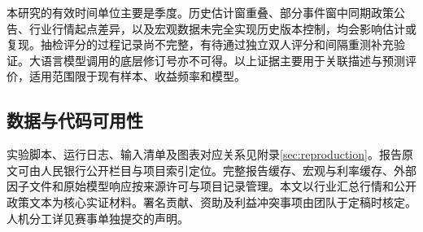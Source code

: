 本研究的有效时间单位主要是季度。历史估计窗重叠、部分事件窗中同期政策公告、行业行情起点差异，以及宏观数据未完全实现历史版本控制，均会影响估计或复现。抽检评分的过程记录尚不完整，有待通过独立双人评分和间隔重测补充验证。大语言模型调用的底层修订号亦不可得。以上证据主要用于关联描述与预测评价，适用范围限于现有样本、收益频率和模型。

\subsection{数据与代码可用性}
实验脚本、运行日志、输入清单及图表对应关系见附录\ref{sec:reproduction}。报告原文可由人民银行公开栏目与项目索引定位。完整报告缓存、宏观与利率缓存、外部因子文件和原始模型响应按来源许可与项目记录管理。本文以行业汇总行情和公开政策文本为核心实证材料。署名贡献、资助及利益冲突事项由团队于定稿时核定。人机分工详见赛事单独提交的声明。
